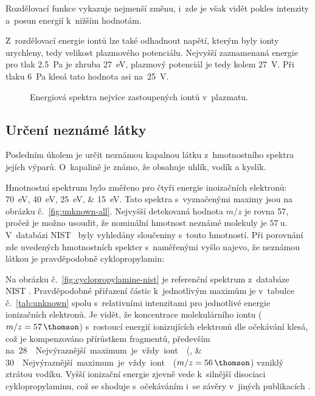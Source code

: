 \documentclass{protokol}
\newcommand\mz{m/z}
\begin{document}
Rozdělovací funkce  vykazuje nejmenší změnu,
i~zde je však vidět pokles intenzity a~posun energií k~nižším hodnotám.

Z~rozdělovací energie iontů lze také odhadnout napětí, kterým byly ionty
urychleny, tedy velikost plazmového potenciálu.
Nejvyšší zaznamenaná energie pro tlak \SI{2.5}{\pascal} je zhruba
\SI{27}{\electronvolt}, plazmový potenciál je tedy kolem \SI{27}{\volt}.
Při tlaku \SI{6}{\pascal} klesá tato hodnota asi na~\SI{25}{\volt}.

\begin{figure}[htp]
	\centering
	
	
	\caption{Energiová spektra nejvíce zastoupených iontů v~plazmatu.}
	\label{fig:energy}
\end{figure}

\subsection{Určení neznámé látky}
\label{sec:unknown}
Posledním úkolem je určit neznámou kapalnou látku z~hmotnostního spektra
jejích výparů.
O~kapalině je známo, že obsahuje uhlík, vodík a kyslík.

Hmotnostní spektrum bylo změřeno pro čtyři energie inoizačních elektronů:
\SIlist[list-separator={, }]{70;40;25;15}{\electronvolt}.
Tato spektra s~vyznačenými maximy jsou na obrázku č.~\ref{fig:unknown-all}.
Nejvyšší detekovaná hodnota $\mz$ je rovna \SI{57}{\thomson},
pročež je možno usoudit, že nominální hmotnost neznámé molekuly
je $\SI{57}{\amu}$.
V~databázi NIST~\parencite{nist} byly vyhledány sloučeniny s~touto hmotností.
Při porovnání zde uvedených hmotnostních spekter s~naměřenými vyšlo najevo,
že neznámou látkou je pravděpodobně cyklopropylamin:
\begin{center}
\end{center}

Na obrázku č.~\ref{fig:cyclopropylamine-nist} je referenční spektrum
z~databáze NIST \parencite{nist}.
Pravděpodobné přiřazení částic k~jednotlivým maximům je
v~tabulce č.~\ref{tab:unknown} spolu s~relativními intenzitami
pro jednotlivé energie ionizačních elektronů.
Je vidět, že koncentrace molekulárního iontu ($\mz = \SI{57}\thomson$)
s~rostoucí energií ionizujících elektronů dle očekávání klesá,
což je kompenzováno přírůstkem fragmentů,
především na~\SIlist{28;30}\thomson.
Nejvýraznější maximum je vždy iont  ($\mz = \SI{56}\thomson$)
vzniklý ztrátou vodíku.
Vyšší ionizační energie zjevně vede k~silnější disociaci cyklopropylaminu,
což se shoduje s~očekáváním i~se závěry v~jiných publikacích \parencite{papp}.
\end{document}
